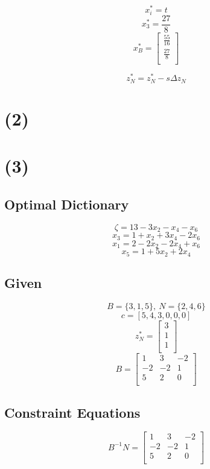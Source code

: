 \documentclass[14pt]{extarticle}
\begin{document}
\[
    x^*_i = t
\]
\[
    x^*_3 = \frac{27}{8}
\]
\[
    x^*_B = \begin{bmatrix}
        \frac{55}{16} \\
        \frac{27}{8} \\
    \end{bmatrix}
\]

\[
    z^*_N = z^*_N - s \Delta z_N
\]

\section*{(2)}

\section*{(3)}
\subsection*{Optimal Dictionary}
\[
    \zeta = 13-3x_2-x_4-x_6
\]
\[
    x_3 = 1+x_2+3x_4-2x_6
\]
\[
    x_1 = 2-2x_2-2x_4+x_6
\]
\[
    x_5 = 1+5x_2+2x_4
\]

\subsection*{Given}
\[
    B = \{3, 1, 5\},\ N = \{2, 4, 6\}
\]
\[
    c = [5, 4, 3, 0, 0, 0]
\]
\[
    z^*_N = \begin{bmatrix}
        3 \\
        1 \\
        1 \\
    \end{bmatrix}
\]
\[
    B = \begin{bmatrix}
        1 & 3 & -2 \\
        -2 & -2 & 1 \\
        5 & 2 & 0 \\
    \end{bmatrix}
\]

\subsection*{Constraint Equations}
\[
    B^{-1}N = \begin{bmatrix}
        1 & 3 & -2 \\
        -2 & -2 & 1 \\
        5 & 2 & 0 \\
    \end{bmatrix}
\]
\end{document}
